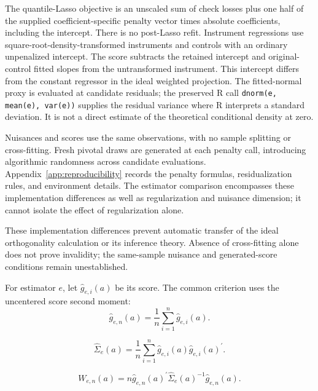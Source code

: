 The quantile-Lasso objective is an unscaled sum of check losses plus one half of the supplied coefficient-specific penalty vector times absolute coefficients, including the intercept. There is no post-Lasso refit. Instrument regressions use square-root-density-transformed instruments and controls with an ordinary unpenalized intercept. The score subtracts the retained intercept and original-control fitted slopes from the untransformed instrument. This intercept differs from the constant regressor in the ideal weighted projection. The fitted-normal proxy is evaluated at candidate residuals; the preserved R call \texttt{dnorm(e, mean(e), var(e))} supplies the residual variance where R interprets a standard deviation. It is not a direct estimate of the theoretical conditional density at zero.

Nuisances and scores use the same observations, with no sample splitting or cross-fitting. Fresh pivotal draws are generated at each penalty call, introducing algorithmic randomness across candidate evaluations. Appendix~\ref{app:reproducibility} records the penalty formulas, residualization rules, and environment details. The estimator comparison encompasses these implementation differences as well as regularization and nuisance dimension; it cannot isolate the effect of regularization alone.

These implementation differences prevent automatic transfer of the ideal orthogonality calculation or its inference theory. Absence of cross-fitting alone does not prove invalidity; the same-sample nuisance and generated-score conditions remain unestablished.

For estimator $e$, let $\widehat g_{e,i}(a)$ be its score. The common criterion uses the uncentered score second moment:
\begin{equation}
    \widehat g_{e,n}(a)
    =
    \frac{1}{n}\sum_{i=1}^{n}\widehat g_{e,i}(a).
    \label{eq:sample-gmm-moment}
\end{equation}

\begin{equation}
    \widehat\Sigma_e(a)
    =
    \frac{1}{n}\sum_{i=1}^{n}
    \widehat g_{e,i}(a)\widehat g_{e,i}(a)^{\prime}.
    \label{eq:score-covariance}
\end{equation}

\begin{equation}
    W_{e,n}(a)
    =
    n\widehat g_{e,n}(a)^{\prime}
    \widehat\Sigma_e(a)^{-1}
    \widehat g_{e,n}(a).
    \label{eq:gmm-criterion}
\end{equation}

